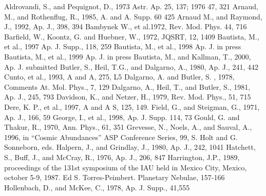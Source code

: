 \begin{thebibliography}{25}

	Aldrovandi, S.,  and Pequignot, D., 1973 Astr. Ap. 25, 137; 1976 47, 321
	Arnaud, M., and Rothenflug, R., 1985, A. and A. Supp. 60 425
	Arnaud M., and Raymond, J., 1992, Ap. J.,  398, 394
	Bambynek W., et al.1972, Rev. Mod. Phys. 44, 716
	Barfield, W., Koontz, G. and Huebner, W., 1972, JQSRT, 12, 1409
	Bautista, M., et al., 1997 Ap. J. Supp., 118, 259
	Bautista, M., et al., 1998 Ap. J. in press
	Bautista, M., et al., 1999 Ap. J. in press
	Bautista, M., and Kallman, T., 2000, Ap. J. submitted
	Butler, S., Heil, T.G., and Dalgarno, A., 1980, Ap. J., 241, 442
	Cunto, et al., 1993, A and A, 275, L5
	Dalgarno, A. and Butler, S. , 1978, Comments At. Mol. Phys., 7, 129
	Dalgarno, A., Heil, T., and Butler, S., 1981, Ap. J., 245, 793
	  Davidson, K., and Netzer, H., 1979, Rev. Mod. Phys., 51, 715
	 Dere, K. P., et al., 1997, A and A S, 125, 149.
	Field, G.,  and Steigman, G.,  1971, Ap. J., 166, 59
	George, I., et al., 1998, Ap. J. Supp. 114, 73
	Gould, G.  and Thakur, R., 1970, Ann. Phys., 61, 351
	Grevesse, N., Noels, A., and Sauval, A., 1996, in  ``Cosmic Abundances'' ASP Conference Series, 99, S. Holt and G. Sonneborn, eds.
	Halpern, J., and Grindlay, J., 1980, Ap. J., 242, 1041
	Hatchett, S., Buff, J., and McCray, R., 1976, Ap. J., 206, 847
	Harrington, J.P., 1989, proceedings of the 131st symposium of the IAU held in Mexico City, Mexico, october 5-9, 1987. Ed S. Torres-Peimbert. Planetary Nebulae, 157-166 
	Hollenbach, D., and McKee, C.,  1978, Ap. J. Supp., 41,555

\end{thebibliography}
